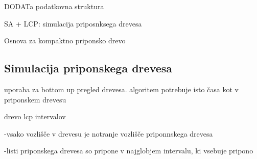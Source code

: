 DODATa podatkovna struktura

SA + LCP: simulacija priposnksega drevesa


Osnova za kompaktno priponsko drevo


\cite{Abouelhoda2004}   

\cite{Manber1990}

\subsection{Simulacija priponskega drevesa}\label{sec:STsimulacija}

uporaba za bottom up pregled drevesa. algoritem potrebuje isto časa kot v priponskem drevesu
\cite{Kasai2001}

drevo lcp intervalov 

-vsako vozlišče v drevesu je notranje vozlišče priponnskega drevesa

-listi priponskega drevesa so pripone v najglobjem intervalu, ki vsebuje pripono \cite{Abouelhoda2004}



